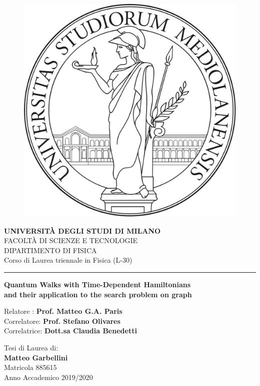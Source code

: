 \begin{titlepage}
    \begin{center}
        \begin{figure}[hbt!]
             \centering
             \includegraphics[width=0.3 \textwidth]{./figures/unimi_logo_tesi}
        \end{figure}
        \textbf{\Large{UNIVERSIT\`A DEGLI STUDI DI MILANO}}\\
        \vspace{12pt}
        \Large{FACOLT\`A DI SCIENZE E TECNOLOGIE}\\
        \Large{DIPARTIMENTO DI FISICA}\\
        \Large{Corso di Laurea triennale in Fisica (L-30)}
        \vspace{24pt}
        \hrule
        \vspace{24pt}
        \textbf{\large{Quantum Walks with Time-Dependent Hamiltonians}\\ \normalsize{and their application to the search problem on graph}} \\

    \end{center}
    \vspace{120pt}
    \begin{flushleft}
        Relatore : \textbf{Prof. Matteo G.A. Paris}\\
        Correlatore: \textbf{Prof. Stefano Olivares}\\
        Correlatrice: \textbf{Dott.sa Claudia Benedetti}
    \end{flushleft}
    \vspace{12pt}
    \begin{flushright}
        Tesi di Laurea di:\\
        \textbf{Matteo Garbellini}\\
        Matricola 885615\\
        Anno Accademico 2019/2020
    \end{flushright}
\end{titlepage}
\newpage
